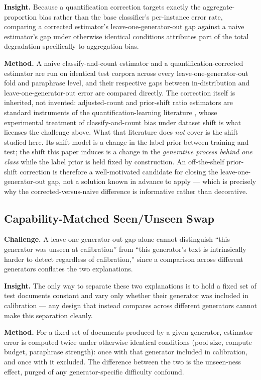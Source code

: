 \documentclass[11pt]{article}
\begin{document}
\textbf{Insight.} Because a quantification correction targets exactly the aggregate-proportion bias rather than the base classifier's per-instance error rate, comparing a corrected estimator's leave-one-generator-out gap against a naive estimator's gap under otherwise identical conditions attributes part of the total degradation specifically to aggregation bias.

\textbf{Method.} A naive classify-and-count estimator and a quantification-corrected estimator are run on identical test corpora across every leave-one-generator-out fold and paraphrase level, and their respective gaps between in-distribution and leave-one-generator-out error are compared directly. The correction itself is inherited, not invented: adjusted-count and prior-shift ratio estimators are standard instruments of the quantification-learning literature \citep{QuantDatasetShift2023,QuantPriorShift2018}, whose experimental treatment of classify-and-count bias under dataset shift is what licenses the challenge above. What that literature does \emph{not} cover is the shift studied here. Its shift model is a change in the label prior between training and test; the shift this paper induces is a change in the \emph{generative process behind one class} while the label prior is held fixed by construction. An off-the-shelf prior-shift correction is therefore a well-motivated candidate for closing the leave-one-generator-out gap, not a solution known in advance to apply --- which is precisely why the corrected-versus-naive difference is informative rather than decorative.

\subsection{Capability-Matched Seen/Unseen Swap}
\textbf{Challenge.} A leave-one-generator-out gap alone cannot distinguish ``this generator was unseen at calibration'' from ``this generator's text is intrinsically harder to detect regardless of calibration,'' since a comparison across different generators conflates the two explanations.

\textbf{Insight.} The only way to separate these two explanations is to hold a fixed set of test documents constant and vary only whether their generator was included in calibration --- any design that instead compares across different generators cannot make this separation cleanly.

\textbf{Method.} For a fixed set of documents produced by a given generator, estimator error is computed twice under otherwise identical conditions (pool size, compute budget, paraphrase strength): once with that generator included in calibration, and once with it excluded. The difference between the two is the unseen-ness effect, purged of any generator-specific difficulty confound.
\end{document}
